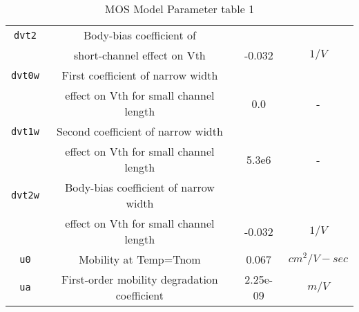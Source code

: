 \documentclass{article}
\begin{document}
\begin{table}[H]
\begin{tabular}{|c| c| c| c|}
\texttt{dvt2} & Body-bias coefficient of & & \\
            & short-channel effect on Vth & -0.032 & $1/V$\\
\texttt{dvt0w} & First coefficient of narrow width & & \\
            & effect on Vth for small channel length & 0.0 & -\\
\texttt{dvt1w} & Second coefficient of narrow width & & \\
             & effect on Vth for small channel length & 5.3e6 & -\\
\texttt{dvt2w} & Body-bias coefficient of narrow width & & \\
             & effect on Vth for small channel length & -0.032 & $1/V$\\
\texttt{u0} & Mobility at Temp=Tnom & 0.067 & $cm^2/V-sec$\\
\texttt{ua} & First-order mobility degradation coefficient & 2.25e-09 & $m/V$\\
\hline
\end{tabular}
\caption{\label{bsim3nsoi.params1} MOS Model Parameter table 1}
\end{table}
\end{document}
